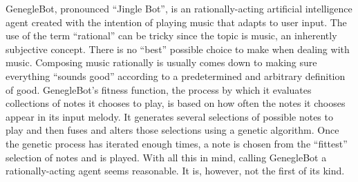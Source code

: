 \documentclass[conference]{IEEEtran}
\begin{document}
GenegleBot, pronounced “Jingle Bot”, is an rationally-acting artificial intelligence  agent created with the intention of playing music that adapts to user input.  The use of the term “rational” can be tricky since the topic is music, an inherently subjective concept.  There is no “best” possible choice to make when dealing with music.  Composing music rationally is usually comes down to making sure everything “sounds good” according to a predetermined and arbitrary definition of good.  GenegleBot’s fitness function, the process by which it evaluates collections of notes it chooses to play, is based on how often the notes it chooses appear in its input melody.  It generates several selections of possible notes to play and then fuses and alters those selections using a genetic algorithm.  Once the genetic process has iterated enough times, a note is chosen from the “fittest” selection of notes and is played.  With all this in mind, calling GenegleBot a rationally-acting agent seems reasonable.  It is, however, not the first of its kind.
\end{document}
